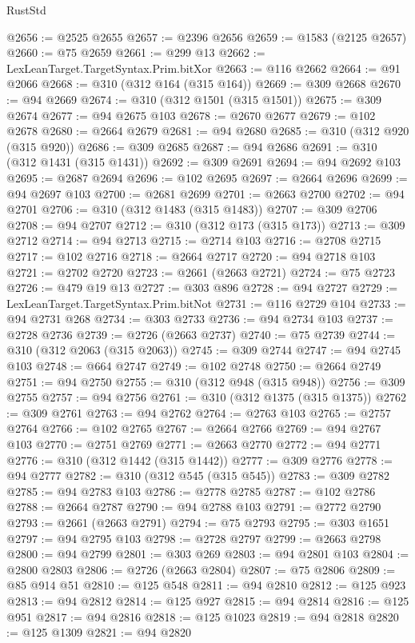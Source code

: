 \begin{lexlean}{RustStd}
\begin{coremodule}
@2656 := @2525 @2655
@2657 := @2396 @2656
@2659 := @1583 (@2125 @2657)
@2660 := @75 @2659
@2661 := @299 @13
@2662 := LexLeanTarget.TargetSyntax.Prim.bitXor
@2663 := @116 @2662
@2664 := @91 @2066
@2668 := @310 (@312 @164 (@315 @164))
@2669 := @309 @2668
@2670 := @94 @2669
@2674 := @310 (@312 @1501 (@315 @1501))
@2675 := @309 @2674
@2677 := @94 @2675 @103
@2678 := @2670 @2677
@2679 := @102 @2678
@2680 := @2664 @2679
@2681 := @94 @2680
@2685 := @310 (@312 @920 (@315 @920))
@2686 := @309 @2685
@2687 := @94 @2686
@2691 := @310 (@312 @1431 (@315 @1431))
@2692 := @309 @2691
@2694 := @94 @2692 @103
@2695 := @2687 @2694
@2696 := @102 @2695
@2697 := @2664 @2696
@2699 := @94 @2697 @103
@2700 := @2681 @2699
@2701 := @2663 @2700
@2702 := @94 @2701
@2706 := @310 (@312 @1483 (@315 @1483))
@2707 := @309 @2706
@2708 := @94 @2707
@2712 := @310 (@312 @173 (@315 @173))
@2713 := @309 @2712
@2714 := @94 @2713
@2715 := @2714 @103
@2716 := @2708 @2715
@2717 := @102 @2716
@2718 := @2664 @2717
@2720 := @94 @2718 @103
@2721 := @2702 @2720
@2723 := @2661 (@2663 @2721)
@2724 := @75 @2723
@2726 := @479 @19 @13
@2727 := @303 @896
@2728 := @94 @2727
@2729 := LexLeanTarget.TargetSyntax.Prim.bitNot
@2731 := @116 @2729 @104
@2733 := @94 @2731 @268
@2734 := @303 @2733
@2736 := @94 @2734 @103
@2737 := @2728 @2736
@2739 := @2726 (@2663 @2737)
@2740 := @75 @2739
@2744 := @310 (@312 @2063 (@315 @2063))
@2745 := @309 @2744
@2747 := @94 @2745 @103
@2748 := @664 @2747
@2749 := @102 @2748
@2750 := @2664 @2749
@2751 := @94 @2750
@2755 := @310 (@312 @948 (@315 @948))
@2756 := @309 @2755
@2757 := @94 @2756
@2761 := @310 (@312 @1375 (@315 @1375))
@2762 := @309 @2761
@2763 := @94 @2762
@2764 := @2763 @103
@2765 := @2757 @2764
@2766 := @102 @2765
@2767 := @2664 @2766
@2769 := @94 @2767 @103
@2770 := @2751 @2769
@2771 := @2663 @2770
@2772 := @94 @2771
@2776 := @310 (@312 @1442 (@315 @1442))
@2777 := @309 @2776
@2778 := @94 @2777
@2782 := @310 (@312 @545 (@315 @545))
@2783 := @309 @2782
@2785 := @94 @2783 @103
@2786 := @2778 @2785
@2787 := @102 @2786
@2788 := @2664 @2787
@2790 := @94 @2788 @103
@2791 := @2772 @2790
@2793 := @2661 (@2663 @2791)
@2794 := @75 @2793
@2795 := @303 @1651
@2797 := @94 @2795 @103
@2798 := @2728 @2797
@2799 := @2663 @2798
@2800 := @94 @2799
@2801 := @303 @269
@2803 := @94 @2801 @103
@2804 := @2800 @2803
@2806 := @2726 (@2663 @2804)
@2807 := @75 @2806
@2809 := @85 @914 @51
@2810 := @125 @548
@2811 := @94 @2810
@2812 := @125 @923
@2813 := @94 @2812
@2814 := @125 @927
@2815 := @94 @2814
@2816 := @125 @951
@2817 := @94 @2816
@2818 := @125 @1023
@2819 := @94 @2818
@2820 := @125 @1309
@2821 := @94 @2820

\end{coremodule}
\end{lexlean}
